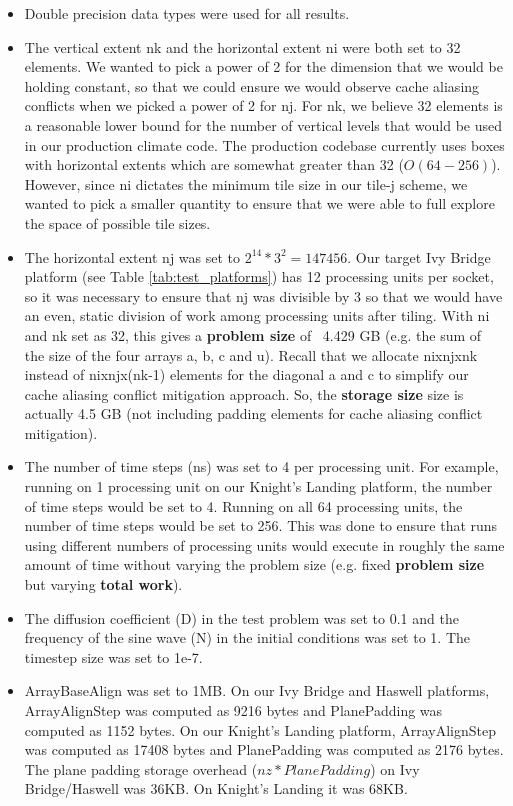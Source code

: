 \documentclass[conference]{IEEEtran}
\begin{document}
\begin{itemize}
\item Double precision data types were used for all results. 
\item The vertical extent nk and the horizontal extent ni were both set to 32
elements. We wanted to pick a power of 2 for the dimension that we would be
holding constant, so that we could ensure we would observe cache aliasing
conflicts when we picked a power of 2 for nj. For nk, we believe 32 elements is
a reasonable lower bound for the number of vertical levels that would be used
in our production climate code. The production codebase currently uses boxes
with horizontal extents which are somewhat greater than 32 (\(O(64-256)\)).
However, since ni dictates the minimum tile size in our tile-j scheme, we
wanted to pick a smaller quantity to ensure that we were able to full explore
the space of possible tile sizes. 
\item The horizontal extent nj was set to \(2^14*3^2=147456\). Our target Ivy
Bridge platform (see Table \ref{tab:test_platforms}) has 12 processing units
per socket, so it was necessary to ensure that nj was divisible by 3 so that we
would have an even, static division of work among processing units after
tiling. With ni and nk set as 32, this gives a \textbf{problem size} of ~4.429
GB (e.g. the sum of the size of the four arrays a, b, c and u). Recall that we
allocate nixnjxnk instead of nixnjx(nk-1) elements for the diagonal a and c to
simplify our cache aliasing conflict mitigation approach. So, the
\textbf{storage size} size is actually 4.5 GB (not including padding elements
for cache aliasing conflict mitigation).
\item The number of time steps (ns) was set to 4 per processing unit. For
example, running on 1 processing unit on our Knight's Landing platform, the
number of time steps would be set to 4. Running on all 64 processing units, the
number of time steps would be set to 256. This was done to ensure that runs
using different numbers of processing units would execute in roughly the same
amount of time without varying the problem size (e.g. fixed \textbf{problem
size} but varying \textbf{total work}).
\item The diffusion coefficient (D) in the test problem was set to 0.1 and the
frequency of the sine wave (N) in the initial conditions was set to 1. The
timestep size was set to 1e-7.
\item ArrayBaseAlign was set to 1MB. On our Ivy Bridge and Haswell platforms,
ArrayAlignStep was computed as 9216 bytes and PlanePadding was computed as 1152
bytes. On our Knight's Landing platform, ArrayAlignStep was computed as 17408
bytes and PlanePadding was computed as 2176 bytes. The plane padding storage
overhead (\(nz*PlanePadding\)) on Ivy Bridge/Haswell was 36KB. On Knight's
Landing it was 68KB.
\end{itemize}
\end{document}
